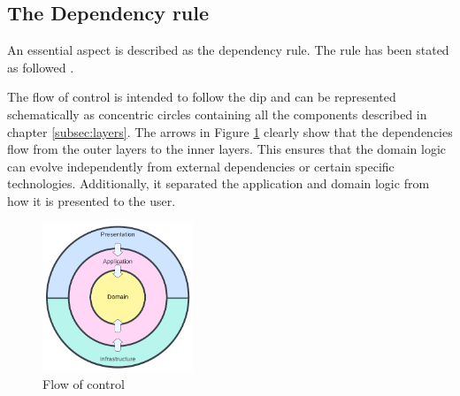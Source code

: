 \subsection{The Dependency rule} \label{sebsec:dependency_rule}

An essential aspect is described as the dependency rule. The rule has been stated as
followed \parencite[206]{robert_c_martin_clean_2018}.


The flow of control is intended to follow the \gls{dip} and can be represented
schematically as concentric circles containing all the components described in chapter
\ref{subsec:layers}. The arrows in Figure \ref{fig:modulair_components} clearly show that
the dependencies flow from the outer layers to the inner layers. This ensures that the
domain logic can evolve independently from external dependencies or certain specific
technologies. Additionally, it separated the application and domain logic from how it is
presented to the user. 

\begin{figure}[H]
    \centering
    \includegraphics[width=0.4\textwidth]{Figures/ca_diagram.pdf}
    \caption[modularity]{Flow of control}
    \label{fig:modulair_components}
\end{figure}